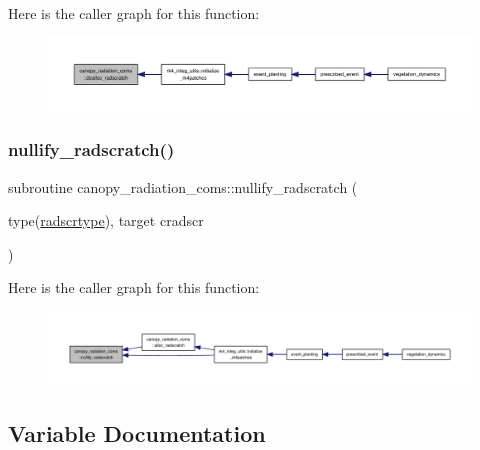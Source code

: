 Here is the caller graph for this function\+:
\nopagebreak
\begin{figure}[H]
\begin{center}
\leavevmode
\includegraphics[width=350pt]{namespacecanopy__radiation__coms_abbcda361926e277937b84aa18b779d72_icgraph}
\end{center}
\end{figure}
\mbox{\label{namespacecanopy__radiation__coms_a5d6cfa703bca9703874fe55efaf4f05d}} 
\subsubsection{\texorpdfstring{nullify\+\_\+radscratch()}{nullify\_radscratch()}}
{\footnotesize\ttfamily subroutine canopy\+\_\+radiation\+\_\+coms\+::nullify\+\_\+radscratch (\begin{DoxyParamCaption}\item[{type(\hyperlink{structcanopy__radiation__coms_1_1radscrtype}{radscrtype}), target}]{cradscr }\end{DoxyParamCaption})}

Here is the caller graph for this function\+:
\nopagebreak
\begin{figure}[H]
\begin{center}
\leavevmode
\includegraphics[width=350pt]{namespacecanopy__radiation__coms_a5d6cfa703bca9703874fe55efaf4f05d_icgraph}
\end{center}
\end{figure}


\subsection{Variable Documentation}
\mbox{\label{namespacecanopy__radiation__coms_a4ab5b29df445f0f0c4e230192ad288ba}} 
